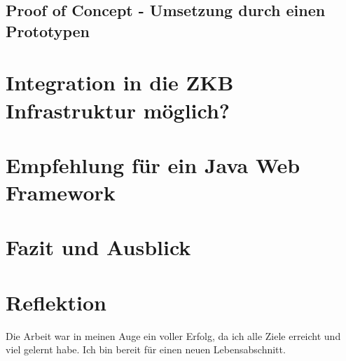 \documentclass[
11pt, %
a4paper, %
BCOR25mm, %
DIV14, %
footsepline = false, %
headsepline, %
twoside, %
openright,
abstracton, %
listof=totocnumbered, %
bibliography=totocnumbered %
]{scrreprt}
\begin{document}
  \section{Proof of Concept - Umsetzung durch einen Prototypen}

  \cleardoublepage
  
   
  \chapter{Integration in die ZKB Infrastruktur möglich?}

  \cleardoublepage
  
   
  \chapter{Empfehlung für ein Java Web Framework}

  \cleardoublepage
  
   
  \chapter{Fazit und Ausblick} 

  \cleardoublepage
  
  
  \chapter{Reflektion}
  
  Die Arbeit war in meinen Auge ein voller Erfolg, da ich alle Ziele erreicht
  und viel gelernt habe. Ich bin bereit für einen neuen
  Lebensabschnitt.
\end{document}
